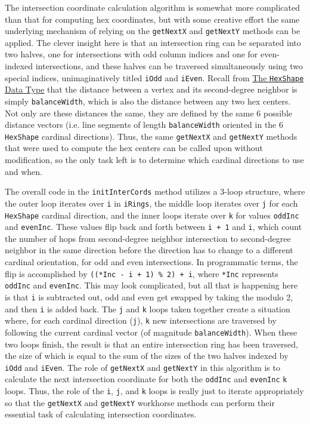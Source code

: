 \documentclass[pageno]{jpaper}
\begin{document}
\begin{doublespacing}
The intersection coordinate calculation algorithm is somewhat more complicated than that for computing hex coordinates, but with some creative effort the same underlying mechanism of relying on the \lstinline$getNextX$ and \lstinline$getNextY$ methods can be applied. The clever insight here is that an intersection ring can be separated into two halves, one for intersections with odd column indices and one for even-indexed intersections, and these halves can be traversed simultaneously using two special indices, unimaginatively titled \lstinline$iOdd$ and \lstinline$iEven$. Recall from \hyperlink{sec:the_hexshape_data_type}{The \lstinline$HexShape$ Data Type} that the distance between a vertex and its second-degree neighbor is simply \lstinline$balanceWidth$, which is also the distance between any two hex centers. Not only are these distances the same, they are defined by the same 6 possible distance vectors (i.e. line segments of length \lstinline$balanceWidth$ oriented in the 6 \lstinline$HexShape$ cardinal directions). Thus, the same \lstinline$getNextX$ and \lstinline$getNextY$ methods that were used to compute the hex centers can be called upon without modification, so the only task left is to determine which cardinal directions to use and when.

The overall code in the \lstinline$initInterCords$ method utilizes a 3-loop structure, where the outer loop iterates over \lstinline$i$ in \lstinline$iRings$, the middle loop iterates over \lstinline$j$ for each \lstinline$HexShape$ cardinal direction, and the inner loops iterate over \lstinline$k$ for values \lstinline$oddInc$ and \lstinline$evenInc$. These values flip back and forth between \lstinline$i + 1$ and \lstinline$i$, which count the number of hops from second-degree neighbor intersection to second-degree neighbor in the same direction before the direction has to change to a different cardinal orientation, for odd and even intersections. In programmatic terms, the flip is accomplished by \lstinline$((*Inc - i + 1) % 2) + i$, where \lstinline$*Inc$ represents \lstinline$oddInc$ and \lstinline$evenInc$. This may look complicated, but all that is happening here is that \lstinline$i$ is subtracted out, odd and even get swapped by taking the modulo 2, and then \lstinline$i$ is added back. The \lstinline$j$ and \lstinline$k$ loops taken together create a situation where, for each cardinal direction (\lstinline$j$), \lstinline$k$ new intersections are traversed by following the current cardinal vector (of magnitude \lstinline$balanceWidth$). When these two loops finish, the result is that an entire intersection ring has been traversed, the size of which is equal to the sum of the sizes of the two halves indexed by \lstinline$iOdd$ and \lstinline$iEven$. The role of \lstinline$getNextX$ and \lstinline$getNextY$ in this algorithm is to calculate the next intersection coordinate for both the \lstinline$oddInc$ and \lstinline$evenInc$ \lstinline$k$ loops. Thus, the role of the \lstinline$i$, \lstinline$j$, and \lstinline$k$ loops is really just to iterate appropriately so that the \lstinline$getNextX$ and \lstinline$getNextY$ workhorse methods can perform their essential task of calculating intersection coordinates.


\end{doublespacing}
\end{document}
